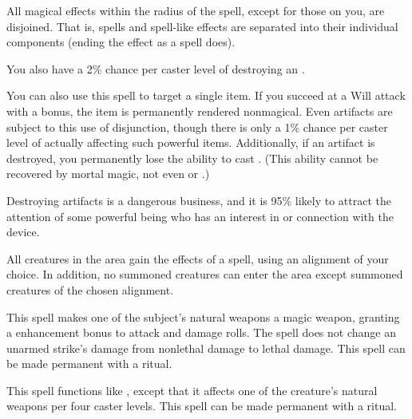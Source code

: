 \spelleffect All magical effects within the radius of the spell, except for those on you, are disjoined. That is, spells and spell-like effects are separated into their individual components (ending the effect as a  spell does).
\par You also have a 2\% chance per caster level of destroying an .
\par You can also use this spell to target a single item. If you succeed at a Will attack with a  bonus, the item is permanently rendered nonmagical. Even artifacts are subject to this use of disjunction, though there is only a 1\% chance per caster level of actually affecting such powerful items. Additionally, if an artifact is destroyed, you permanently lose the ability to cast . (This ability cannot be recovered by mortal magic, not even  or .)
\par {} Destroying artifacts is a dangerous business, and it is 95\% likely to attract the attention of some powerful being who has an interest in or connection with the device.

\spelldur{\durshort \dismissable}
\spelleffect All creatures in the area gain the effects of a  spell, using an alignment of your choice. In addition, no summoned creatures can enter the area except summoned creatures of the chosen alignment.

\spelldur{\durshort}
\spelleffect This spell makes one of the subject's natural weapons a  magic weapon, granting a  enhancement bonus to attack and damage rolls. \spellbonusscalingdescription
\spellnotes The spell does not change an unarmed strike's damage from nonlethal damage to lethal damage. This spell can be made permanent with a  ritual.

\spelleffect This spell functions like , except that it affects one of the creature's natural weapons per four caster levels.
\spellnotes This spell can be made permanent with a  ritual.

